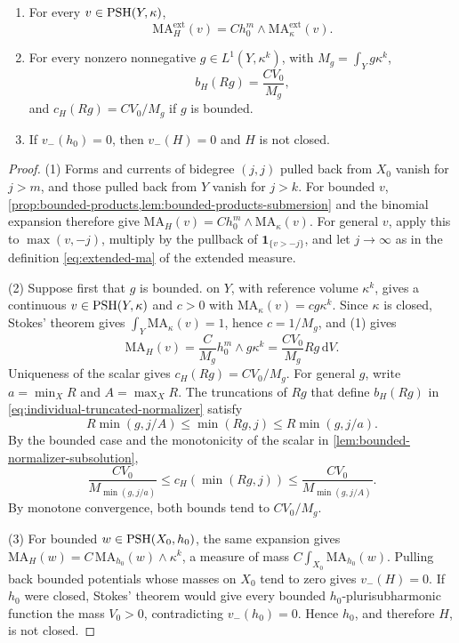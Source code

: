 \begin{lemma}\label{lem:split-product-normalization}
\begin{enumerate}
\item For every $v\in\mathrm{PSH}(Y,\kappa)$,
\begin{equation}\label{eq:split-product-ma}
 \mathrm{MA}^{\mathrm{ext}}_H(v)=Ch_0^m\wedge\mathrm{MA}^{\mathrm{ext}}_\kappa(v).
\end{equation}
\item For every nonzero nonnegative $g\in L^1(Y,\kappa^k)$, with $M_g=\int_Yg\kappa^k$,
\[
 b_H(Rg)=\frac{CV_0}{M_g},
\]
and $c_H(Rg)=CV_0/M_g$ if $g$ is bounded.
\item If $v_-(h_0)=0$, then $v_-(H)=0$ and $H$ is not closed.
\end{enumerate}
\end{lemma}
\begin{proof}
(1) Forms and currents of bidegree $(j,j)$ pulled back from $X_0$ vanish for $j>m$, and those pulled back from $Y$ vanish for $j>k$. For bounded $v$, \cref{prop:bounded-products,lem:bounded-products-submersion} and the binomial expansion therefore give $\mathrm{MA}_H(v)=Ch_0^m\wedge\mathrm{MA}_\kappa(v)$. For general $v$, apply this to $\max(v,-j)$, multiply by the pullback of $\mathbf1_{\{v>-j\}}$, and let $j\to\infty$ as in the definition \eqref{eq:extended-ma} of the extended measure.

(2) Suppose first that $g$ is bounded.  on $Y$, with reference volume $\kappa^k$, gives a continuous $v\in\mathrm{PSH}(Y,\kappa)$ and $c>0$ with $\mathrm{MA}_\kappa(v)=cg\kappa^k$. Since $\kappa$ is closed, Stokes' theorem gives $\int_Y\mathrm{MA}_\kappa(v)=1$, hence $c=1/M_g$, and (1) gives
\[
 \mathrm{MA}_H(v)=\frac{C}{M_g}h_0^m\wedge g\kappa^k
 =\frac{CV_0}{M_g}Rg\,\mathrm{d}V.
\]
Uniqueness of the scalar gives $c_H(Rg)=CV_0/M_g$. For general $g$, write $a=\min_XR$ and $A=\max_XR$. The truncations of $Rg$ that define $b_H(Rg)$ in \eqref{eq:individual-truncated-normalizer} satisfy
\[
 R\min(g,j/A)\leq\min(Rg,j)\leq R\min(g,j/a).
\]
By the bounded case and the monotonicity of the scalar in \cref{lem:bounded-normalizer-subsolution},
\[
 \frac{CV_0}{M_{\min(g,j/a)}}\leq c_H(\min(Rg,j))
                         \leq\frac{CV_0}{M_{\min(g,j/A)}}.
\]
By monotone convergence, both bounds tend to $CV_0/M_g$.

(3) For bounded $w\in\mathrm{PSH}(X_0,h_0)$, the same expansion gives $\mathrm{MA}_H(w)=C\,\mathrm{MA}_{h_0}(w)\wedge\kappa^k$, a measure of mass $C\int_{X_0}\mathrm{MA}_{h_0}(w)$. Pulling back bounded potentials whose masses on $X_0$ tend to zero gives $v_-(H)=0$. If $h_0$ were closed, Stokes' theorem would give every bounded $h_0$-plurisubharmonic function the mass $V_0>0$, contradicting $v_-(h_0)=0$. Hence $h_0$, and therefore $H$, is not closed.
\end{proof}

